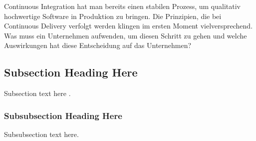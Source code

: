 Continuous Integration hat man bereits einen stabilen Prozess, um qualitativ hochwertige Software in Produktion zu bringen. Die Prinzipien, die bei Continuous Delivery verfolgt werden klingen im ersten Moment vielversprechend. Was muss ein Unternehmen aufwenden, um diesen Schritt zu gehen und welche Auswirkungen hat diese Entscheidung auf das Unternehmen?

\subsection{Subsection Heading Here}
Subsection text here \cite{Hsiao.2013}.

\subsubsection{Subsubsection Heading Here}
Subsubsection text here.
